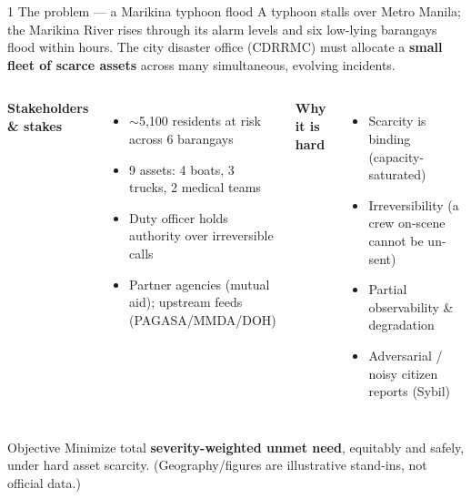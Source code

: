 \documentclass[aspectratio=169,11pt]{beamer}
\begin{document}
\begin{frame}{1 \;\; The problem --- a Marikina typhoon flood}
  \small
  A typhoon stalls over Metro Manila; the Marikina River rises through its alarm levels and
  six low-lying barangays flood within hours. The city disaster office (CDRRMC) must allocate
  a \textbf{small fleet of scarce assets} across many simultaneous, evolving incidents.
  \begin{columns}[T]
    \textbf{Stakeholders \& stakes}
    \begin{itemize}\small
      \item $\sim$5{,}100 residents at risk across 6 barangays
      \item 9 assets: 4 boats, 3 trucks, 2 medical teams
      \item Duty officer holds authority over irreversible calls
      \item Partner agencies (mutual aid); upstream feeds (PAGASA/MMDA/DOH)
    \end{itemize}
    \textbf{Why it is hard}
    \begin{itemize}\small
      \item Scarcity is binding (capacity-saturated)
      \item Irreversibility (a crew on-scene cannot be un-sent)
      \item Partial observability \& degradation
      \item Adversarial / noisy citizen reports (Sybil)
    \end{itemize}
  \end{columns}
  \vspace{0.4em}
  \begin{block}{Objective}
    Minimize total \textbf{severity-weighted unmet need}, equitably and safely, under hard
    asset scarcity. \footnotesize(Geography/figures are illustrative stand-ins, not official data.)
  \end{block}
\end{frame}
\end{document}
